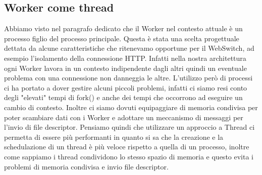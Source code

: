 \documentclass[italian]{tktltiki2}
\begin{document}
\subsection{Worker come thread}
Abbiamo visto nel paragrafo dedicato che il Worker nel contesto attuale è un processo figlio del processo principale. Questa è stata una scelta progettuale dettata da alcune caratteristiche che ritenevamo opportune per il WebSwitch, ad esempio l'isolamento della connessione HTTP. Infatti nella nostra architettura ogni Worker lavora in un contesto indipendente dagli altri quindi un eventuale problema con una connessione non danneggia le altre. L'utilizzo però di processi ci ha portato a dover gestire alcuni piccoli problemi, infatti ci siamo resi conto degli "elevati" tempi di fork() e anche dei tempi che occorrono ad eseguire un cambio di contesto. Inoltre ci siamo dovuti equipaggiare di memoria condivisa per poter scambiare dati con i Worker e adottare un meccanismo di messaggi per l'invio di file descriptor. Pensiamo quindi che utilizzare un approccio a Thread ci permetta di essere più performanti in quanto si sa che la creazione e la schedulazione di un thread è più veloce rispetto a quella di un processo, inoltre come sappiamo i thread condividono lo stesso spazio di memoria e questo evita i problemi di memoria condivisa e invio file descriptor.


%
%
% 
%
\end{document}

